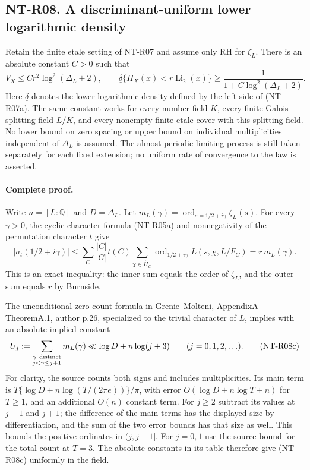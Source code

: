 \subsection*{NT-R08. A discriminant-uniform lower logarithmic density}

Retain the finite etale setting of NT-R07 and assume only RH for
$\zeta_L$. There is an absolute constant $C>0$ such that
\[
 V_X\le C r^2\log^2(\Delta_L+2),\qquad
 \underline\delta\{\Pi_X(x)<r\operatorname{Li}_2(x)\}
 \ge \frac1{1+C\log^2(\Delta_L+2)}.
 \tag{NT-R08a}
\]
Here $\underline\delta$ denotes the lower logarithmic density
defined by the left side of (NT-R07a). The same constant works
for every number field $K$, every finite Galois splitting field
$L/K$, and every nonempty finite etale cover with this splitting
field. No lower bound on zero spacing or upper bound on individual
multiplicities independent of $\Delta_L$ is assumed. The
almost-periodic limiting process is still taken separately for
each fixed extension; no uniform rate of convergence to the law
is asserted.

\paragraph{Complete proof.}
Write $n=[L:\mathbb Q]$ and $D=\Delta_L$. Let
$m_L(\gamma)=\operatorname{ord}_{s=1/2+i\gamma}\zeta_L(s)$.
For every $\gamma>0$, the cyclic-character formula (NT-R05a)
and nonnegativity of the permutation character $t$ give
\[
 |a_t(1/2+i\gamma)|
 \le\sum_C\frac{|C|}{|G|}t(C)
       \sum_{\chi\in\widehat H_C}
          \operatorname{ord}_{1/2+i\gamma}L(s,\chi,L/F_C)
 =r\,m_L(\gamma).
 \tag{NT-R08b}
\]
This is an exact inequality: the inner sum equals the order
of $\zeta_L$, and the outer sum equals $r$ by Burnside.

The unconditional zero-count formula in Grenie--Molteni,
AppendixA TheoremA.1, author p.26, specialized to the trivial
character of $L$, implies with an absolute implied constant
\[
 U_j:=\sum_{\substack{\gamma\ {\rm distinct}\\j<\gamma\le j+1}}
                  m_L(\gamma)
       \ll \log D+n\log(j+3)\qquad(j=0,1,2,\ldots).
 \tag{NT-R08c}
\]
For clarity, the source counts both signs and includes
multiplicities. Its main term is
$T\{\log D+n\log(T/(2\pi e))\}/\pi$, with error
$O(\log D+n\log T+n)$ for $T\ge1$, and an additional
$O(n)$ constant term. For $j\ge2$ subtract its values at
$j-1$ and $j+1$; the difference of the main terms has the
displayed size by differentiation, and the sum of the two
error bounds has that size as well. This bounds the positive
ordinates in $(j,j+1]$. For $j=0,1$ use the source bound for
the total count at $T=3$. The absolute constants in its table
therefore give (NT-R08c) uniformly in the field.

